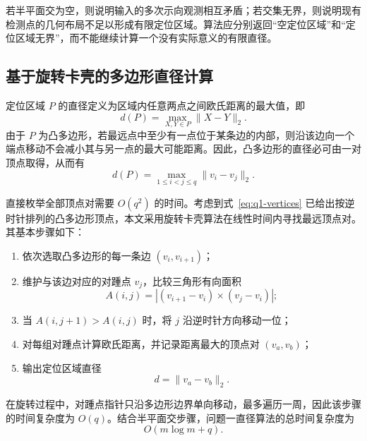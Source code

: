 若半平面交为空，则说明输入的多次示向观测相互矛盾；若交集无界，则说明现有检测点的几何布局不足以形成有限定位区域。算法应分别返回“空定位区域”和“定位区域无界”，而不能继续计算一个没有实际意义的有限直径。

\subsection{基于旋转卡壳的多边形直径计算}

定位区域 $P$ 的直径定义为区域内任意两点之间欧氏距离的最大值，即
\begin{equation}
  d(P)=\max_{X,Y\in P}\|X-Y\|_2.
  \label{eq:q1-diameter-definition}
\end{equation}
由于 $P$ 为凸多边形，若最远点中至少有一点位于某条边的内部，则沿该边向一个端点移动不会减小其与另一点的最大可能距离。因此，凸多边形的直径必可由一对顶点取得，从而有
\begin{equation}
  d(P)=\max_{1\leq i<j\leq q}\|v_i-v_j\|_2.
  \label{eq:q1-diameter-vertices}
\end{equation}

直接枚举全部顶点对需要 $O(q^2)$ 的时间。考虑到式~\eqref{eq:q1-vertices} 已给出按逆时针排列的凸多边形顶点，本文采用旋转卡壳算法\cite{toussaint1983}在线性时间内寻找最远顶点对。其基本步骤如下：

\begin{enumerate}
  \item 依次选取凸多边形的每一条边 $(v_i,v_{i+1})$；
  \item 维护与该边对应的对踵点 $v_j$，比较三角形有向面积
  \begin{equation}
    A(i,j)=\left|(v_{i+1}-v_i)\times(v_j-v_i)\right|;
    \label{eq:q1-antipodal-area}
  \end{equation}
  \item 当 $A(i,j+1)>A(i,j)$ 时，将 $j$ 沿逆时针方向移动一位；
  \item 对每组对踵点计算欧氏距离，并记录距离最大的顶点对 $(v_a,v_b)$；
  \item 输出定位区域直径
  \begin{equation}
    d=\|v_a-v_b\|_2.
    \label{eq:q1-final-diameter}
  \end{equation}
\end{enumerate}

在旋转过程中，对踵点指针只沿多边形边界单向移动，最多遍历一周，因此该步骤的时间复杂度为 $O(q)$。结合半平面交步骤，问题一直径算法的总时间复杂度为
\begin{equation}
  O(m\log m+q).
  \label{eq:q1-total-complexity}
\end{equation}

